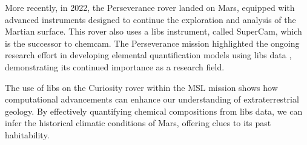 More recently, in 2022, the Perseverance rover landed on Mars, equipped with advanced instruments designed to continue the exploration and analysis of the Martian surface.
This rover also uses a \gls{libs} instrument, called SuperCam, which is the successor to \gls{chemcam}.
The Perseverance mission highlighted the ongoing research effort in developing elemental quantification models using \gls{libs} data \cite{andersonPostlandingMajorElement2022}, demonstrating its continued importance as a research field.

The use of \gls{libs} on the Curiosity rover within the MSL mission shows how computational advancements can enhance our understanding of extraterrestrial geology.
By effectively quantifying chemical compositions from \gls{libs} data, we can infer the historical climatic conditions of Mars, offering clues to its past habitability.
